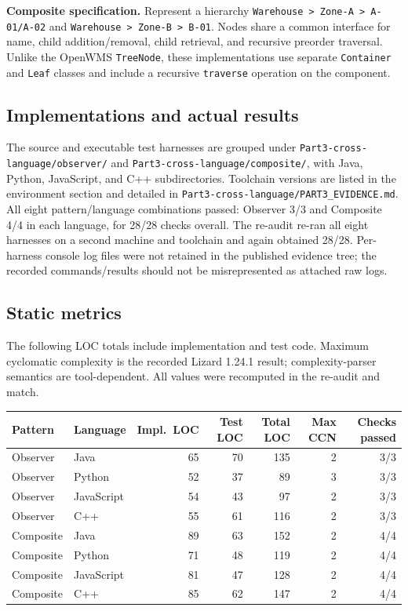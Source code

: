 \documentclass[11pt,a4paper]{article}
\newcommand{\code}[1]{\nolinkurl{#1}}
\begin{document}
\textbf{Composite specification.} Represent a hierarchy \code{Warehouse > Zone-A > A-01/A-02} and \code{Warehouse > Zone-B > B-01}. Nodes share a common interface for name, child addition/removal, child retrieval, and recursive preorder traversal. Unlike the OpenWMS \code{TreeNode}, these implementations use separate \code{Container} and \code{Leaf} classes and include a recursive \code{traverse} operation on the component.

\subsection{Implementations and actual results}
The source and executable test harnesses are grouped under \code{Part3-cross-language/observer/} and \code{Part3-cross-language/composite/}, with Java, Python, JavaScript, and C++ subdirectories. Toolchain versions are listed in the environment section and detailed in \code{Part3-cross-language/PART3_EVIDENCE.md}. All eight pattern/language combinations passed: Observer 3/3 and Composite 4/4 in each language, for 28/28 checks overall. The re-audit re-ran all eight harnesses on a second machine and toolchain and again obtained 28/28. Per-harness console log files were not retained in the published evidence tree; the recorded commands/results should not be misrepresented as attached raw logs.

\subsection{Static metrics}
The following LOC totals include implementation and test code. Maximum cyclomatic complexity is the recorded Lizard 1.24.1 result; complexity-parser semantics are tool-dependent. All values were recomputed in the re-audit and match.

\begin{tabularx}{\linewidth}{@{}llrrrrr@{}}
\toprule
Pattern & Language & Impl.\ LOC & Test LOC & Total LOC & Max CCN & Checks passed\\
\midrule
Observer & Java & 65 & 70 & 135 & 2 & 3/3\\
Observer & Python & 52 & 37 & 89 & 3 & 3/3\\
Observer & JavaScript & 54 & 43 & 97 & 2 & 3/3\\
Observer & C++ & 55 & 61 & 116 & 2 & 3/3\\
Composite & Java & 89 & 63 & 152 & 2 & 4/4\\
Composite & Python & 71 & 48 & 119 & 2 & 4/4\\
Composite & JavaScript & 81 & 47 & 128 & 2 & 4/4\\
Composite & C++ & 85 & 62 & 147 & 2 & 4/4\\
\bottomrule
\end{tabularx}
\end{document}
